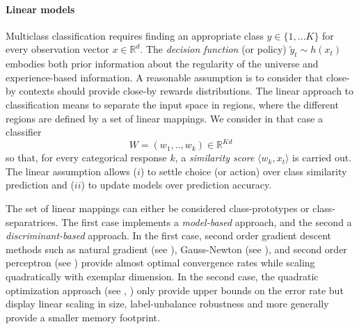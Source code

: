 \documentclass[preprint,12pt,authoryear]{elsarticle}
\begin{document}
\paragraph{Linear models}
Multiclass classification requires  finding an appropriate class $y \in \{1,... K\}$ for every observation vector $x \in \mathbb{R}^d$.
The \textit{decision function} (or policy) $\tilde{y}_t \sim h(x_t)$ embodies both prior information about the regularity of the universe and experience-based information. A reasonable assumption  is to consider that  close-by contexts should provide close-by rewards distributions. 
The linear approach to classification means to separate the input space in regions, where the different regions are defined by a set of linear mappings. We consider in that case a  classifier 
\begin{equation}\label{eq:W}
W = (w_1,..,w_k) \in \mathbb{R}^{K d}
\end{equation} so that, for every categorical response $k$, a \emph{similarity score} $\langle w_k, x_t\rangle$ is carried out. 
The linear assumption allows ($i$) to 
settle choice (or action) over class similarity prediction and ($ii$) to update models over prediction accuracy.

The set of linear mappings can either be considered class-prototypes or class-separatrices. The first case implements a \textit{model-based} approach, and the second a \textit{discriminant-based} approach. In the first case,  second order gradient descent methods such as natural gradient (see \cite{amari2000adaptive}), Gauss-Newton (see \cite{le2004large}), and second order perceptron (see \cite{cesa2005second}) provide almost optimal convergence rates while scaling quadratically with exemplar dimension.
In the second case, the quadratic optimization approach (see \cite{anlauf1989adatron}, \cite{crammer2006online}) only provide upper bounds on the error rate but display linear scaling in size, label-unbalance robustness and more generally provide a smaller memory footprint. 
\end{document}

